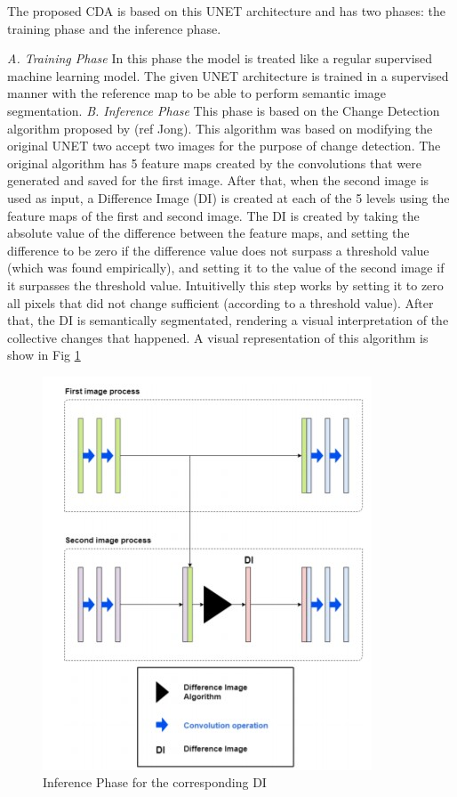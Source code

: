 The proposed CDA is based on this UNET architecture and has two phases: the training phase and the inference phase.

\textit{A. Training Phase}
\newline
In this phase the model is treated like a regular supervised machine learning model. The given UNET architecture is trained in a supervised manner with the reference map
to be able to perform semantic image segmentation. 
\newline
\textit{B. Inference Phase}
\newline
This phase is based on the Change Detection algorithm proposed by (ref Jong). This algorithm was based on modifying the original UNET two accept two images for the purpose of change detection.
The original algorithm has 5 feature maps created by the convolutions that were generated and saved for the first image. After that, when the second image is used as input, a Difference Image (DI) is
created at each of the 5 levels using the feature maps of the first and second image.
The DI is created by taking the absolute value of the difference between the feature maps, and setting the difference to be zero if the difference value does not surpass a threshold value (which was found empirically), and setting it to 
the value of the second image if it surpasses the threshold value. Intuitivelly this step works by setting it to zero all pixels that did not change sufficient (according to a threshold value). After that, the DI is semantically segmentated, rendering a visual 
interpretation of the collective changes that happened. A visual representation of this algorithm is show in Fig \ref{fig:kevin_algorithm}

\begin{figure}[ht]
    \centering
    \includegraphics{Chapter7/kevin_algorithm.jpg}
    \caption{Inference Phase for the corresponding DI}
    \label{fig:kevin_algorithm}
\end{figure}

